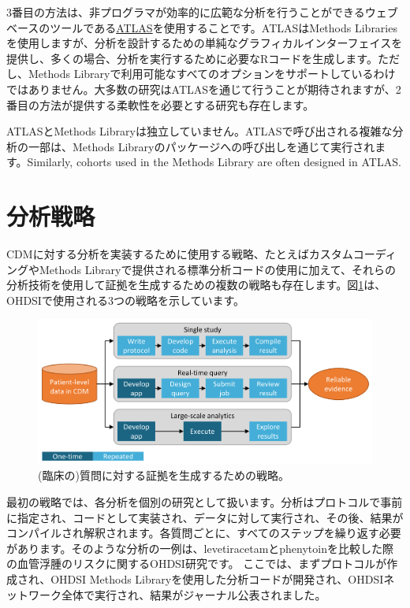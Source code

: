 \documentclass[
  11pt]{book}
\theoremstyle{definition}
\theoremstyle{definition}
\theoremstyle{definition}
\theoremstyle{definition}
\theoremstyle{remark}
\begin{document}
3番目の方法は、非プログラマが効率的に広範な分析を行うことができるウェブベースのツールである\href{https://github.com/OHDSI/Atlas/wiki}{ATLAS}を使用することです。ATLASはMethods Librariesを使用しますが、分析を設計するための単純なグラフィカルインターフェイスを提供し、多くの場合、分析を実行するために必要なRコードを生成します。ただし、Methods Libraryで利用可能なすべてのオプションをサポートしているわけではありません。大多数の研究はATLASを通じて行うことが期待されますが、2番目の方法が提供する柔軟性を必要とする研究も存在します。

ATLASとMethods Libraryは独立していません。ATLASで呼び出される複雑な分析の一部は、Methods Libraryのパッケージへの呼び出しを通じて実行されます。Similarly, cohorts used in the Methods Library are often designed in ATLAS.

\section{分析戦略}\label{ux5206ux6790ux6226ux7565}

CDMに対する分析を実装するために使用する戦略、たとえばカスタムコーディングやMethods Libraryで提供される標準分析コードの使用に加えて、それらの分析技術を使用して証拠を生成するための複数の戦略も存在します。図\ref{fig:strategies}は、OHDSIで使用される3つの戦略を示しています。

\begin{figure}

{\centering \includegraphics[width=0.9\linewidth]{images/OhdsiAnalyticsTools/strategies} 

}

\caption{(臨床の)質問に対する証拠を生成するための戦略。}\label{fig:strategies}
\end{figure}

最初の戦略では、各分析を個別の研究として扱います。分析はプロトコルで事前に指定され、コードとして実装され、データに対して実行され、その後、結果がコンパイルされ解釈されます。各質問ごとに、すべてのステップを繰り返す必要があります。そのような分析の一例は、levetiracetamとphenytoinを比較した際の血管浮腫のリスクに関するOHDSI研究です。 \citep[ ]{duke_2017} ここでは、まずプロトコルが作成され、OHDSI Methods Libraryを使用した分析コードが開発され、OHDSIネットワーク全体で実行され、結果がジャーナル公表されました。
\end{document}
